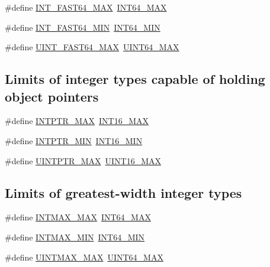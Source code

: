 \begin{DoxyCompactItemize}
\#define \hyperlink{group__avr__stdint_ga13c95cf9c209d8daacb36cbf0d5ba275}{I\+N\+T\+\_\+\+F\+A\+S\+T64\+\_\+\+M\+AX}~\hyperlink{group__avr__stdint_gad0d744f05898e32d01f73f8af3cd2071}{I\+N\+T64\+\_\+\+M\+AX}
\item 
\#define \hyperlink{group__avr__stdint_ga50f0fdcb00ea2500cec0f3d6d45c36f3}{I\+N\+T\+\_\+\+F\+A\+S\+T64\+\_\+\+M\+IN}~\hyperlink{group__avr__stdint_gab21f12f372f67b8ff0aa3432336ede67}{I\+N\+T64\+\_\+\+M\+IN}
\item 
\#define \hyperlink{group__avr__stdint_gaeb74410af7781bc84b5f64ae7a8f4a17}{U\+I\+N\+T\+\_\+\+F\+A\+S\+T64\+\_\+\+M\+AX}~\hyperlink{group__avr__stdint_ga30654b4b67d97c42ca3f9b6052dda916}{U\+I\+N\+T64\+\_\+\+M\+AX}
\end{DoxyCompactItemize}
\subsection*{Limits of integer types capable of holding object pointers}
\begin{DoxyCompactItemize}
\item 
\#define \hyperlink{group__avr__stdint_ga9e5742f2bae4a5283431a3c03499e3a9}{I\+N\+T\+P\+T\+R\+\_\+\+M\+AX}~\hyperlink{group__avr__stdint_gac58f2c111cc9989c86db2a7dc4fd84ca}{I\+N\+T16\+\_\+\+M\+AX}
\item 
\#define \hyperlink{group__avr__stdint_ga2aaa6d3aa1d7d1e0e326955aa24db752}{I\+N\+T\+P\+T\+R\+\_\+\+M\+IN}~\hyperlink{group__avr__stdint_gad4e9955955b27624963643eac448118a}{I\+N\+T16\+\_\+\+M\+IN}
\item 
\#define \hyperlink{group__avr__stdint_gab2355300ea19395357e62d780f4dd073}{U\+I\+N\+T\+P\+T\+R\+\_\+\+M\+AX}~\hyperlink{group__avr__stdint_ga3ea490c9b3617d4479bd80ef93cd5602}{U\+I\+N\+T16\+\_\+\+M\+AX}
\end{DoxyCompactItemize}
\subsection*{Limits of greatest-\/width integer types}
\begin{DoxyCompactItemize}
\item 
\#define \hyperlink{group__avr__stdint_ga022b9b0a3564d786244a4631847c37a3}{I\+N\+T\+M\+A\+X\+\_\+\+M\+AX}~\hyperlink{group__avr__stdint_gad0d744f05898e32d01f73f8af3cd2071}{I\+N\+T64\+\_\+\+M\+AX}
\item 
\#define \hyperlink{group__avr__stdint_ga2b0a3edfc672154f606dc3ad26277b61}{I\+N\+T\+M\+A\+X\+\_\+\+M\+IN}~\hyperlink{group__avr__stdint_gab21f12f372f67b8ff0aa3432336ede67}{I\+N\+T64\+\_\+\+M\+IN}
\item 
\#define \hyperlink{group__avr__stdint_gaa54fd5210434219e9027bfa0f0e325c8}{U\+I\+N\+T\+M\+A\+X\+\_\+\+M\+AX}~\hyperlink{group__avr__stdint_ga30654b4b67d97c42ca3f9b6052dda916}{U\+I\+N\+T64\+\_\+\+M\+AX}
\end{DoxyCompactItemize}

